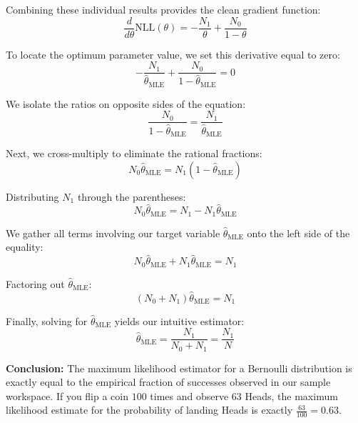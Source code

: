 \documentclass{article}
\begin{document}
Combining these individual results provides the clean gradient function:
\begin{equation}
\frac{d}{d\theta} \text{NLL}(\theta) = -\frac{N_1}{\theta} + \frac{N_0}{1 - \theta}
\end{equation}

To locate the optimum parameter value, we set this derivative equal to zero:
\begin{equation}
-\frac{N_1}{\hat{\theta}_{\text{MLE}}} + \frac{N_0}{1 - \hat{\theta}_{\text{MLE}}} = 0
\end{equation}

We isolate the ratios on opposite sides of the equation:
\begin{equation}
\frac{N_0}{1 - \hat{\theta}_{\text{MLE}}} = \frac{N_1}{\hat{\theta}_{\text{MLE}}}
\end{equation}

Next, we cross-multiply to eliminate the rational fractions:
\begin{equation}
N_0 \hat{\theta}_{\text{MLE}} = N_1 (1 - \hat{\theta}_{\text{MLE}})
\end{equation}

Distributing $N_1$ through the parentheses:
\begin{equation}
N_0 \hat{\theta}_{\text{MLE}} = N_1 - N_1 \hat{\theta}_{\text{MLE}}
\end{equation}

We gather all terms involving our target variable $\hat{\theta}_{\text{MLE}}$ onto the left side of the equality:
\begin{equation}
N_0 \hat{\theta}_{\text{MLE}} + N_1 \hat{\theta}_{\text{MLE}} = N_1
\end{equation}

Factoring out $\hat{\theta}_{\text{MLE}}$:
\begin{equation}
(N_0 + N_1) \hat{\theta}_{\text{MLE}} = N_1
\end{equation}

Finally, solving for $\hat{\theta}_{\text{MLE}}$ yields our intuitive estimator:
\begin{equation}
\hat{\theta}_{\text{MLE}} = \frac{N_1}{N_0 + N_1} = \frac{N_1}{N}
\end{equation}

\textbf{Conclusion:} The maximum likelihood estimator for a Bernoulli distribution is exactly equal to the empirical fraction of successes observed in our sample workspace. If you flip a coin $100$ times and observe $63$ Heads, the maximum likelihood estimate for the probability of landing Heads is exactly $\frac{63}{100} = 0.63$.
\end{document}

